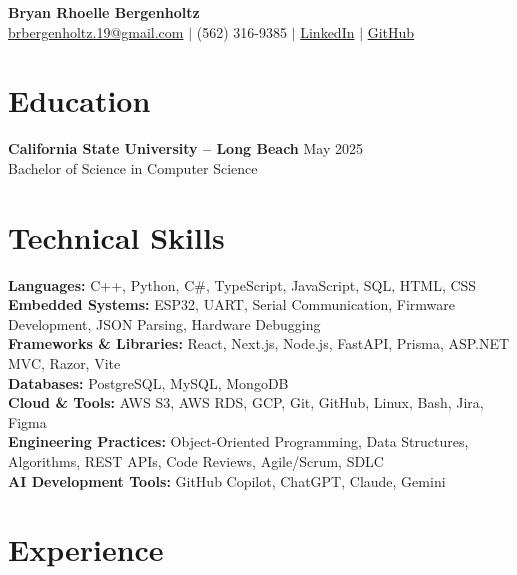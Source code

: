 \documentclass[a4paper,10pt]{article}
\newcommand{\dateright}[1]{%
  \hfill{\small\textnormal{#1}}%
}
\begin{document}

\begin{center}
  {\LARGE\textbf{Bryan Rhoelle Bergenholtz}}\\[-1pt]
  \href{mailto:brbergenholtz.19@gmail.com}
  {brbergenholtz.19@gmail.com}
  $|$ (562) 316-9385
  $|$ \href{https://linkedin.com/in/bryanbergenholtz}{LinkedIn}
  $|$ \href{https://github.com/YanRho}{GitHub}
\end{center}

\vspace{-6pt}

\section*{Education}

\textbf{California State University -- Long Beach}
\dateright{May 2025}\\[-1pt]
Bachelor of Science in Computer Science

\section*{Technical Skills}

\textbf{Languages:}
C++, Python, C\#, TypeScript, JavaScript, SQL, HTML, CSS\\
\textbf{Embedded Systems:}
ESP32, UART, Serial Communication, Firmware Development, JSON Parsing, Hardware Debugging\\
\textbf{Frameworks \& Libraries:}
React, Next.js, Node.js, FastAPI, Prisma, ASP.NET MVC, Razor, Vite\\
\textbf{Databases:}
PostgreSQL, MySQL, MongoDB\\
\textbf{Cloud \& Tools:}
AWS S3, AWS RDS, GCP, Git, GitHub, Linux, Bash, Jira, Figma\\
\textbf{Engineering Practices:}
Object-Oriented Programming, Data Structures, Algorithms, REST APIs, Code Reviews, Agile/Scrum, SDLC\\
\textbf{AI Development Tools:}
GitHub Copilot, ChatGPT, Claude, Gemini

\section*{Experience}
\end{document}
